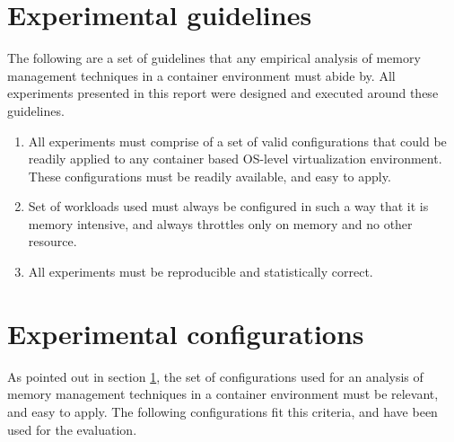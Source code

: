   \section{Experimental guidelines}
    \label{section_guidelines}
    
    The following are a set of guidelines that any empirical analysis of memory management techniques in a container environment must 
abide by.  All experiments presented in this report were designed and executed around these guidelines.

    \begin{enumerate}
      \item All experiments must comprise of a set of valid configurations that could be readily applied to any container based OS-level 
virtualization environment. These configurations must be readily available, and easy to apply.
      \item Set of workloads used must always be configured in such a way that it is memory intensive, and always throttles only on memory 
and no other resource.
      \item All experiments must be reproducible and statistically correct.      
    \end{enumerate}

  \section{Experimental configurations}
    
    As pointed out in section \ref{section_guidelines}, the set of configurations used for an analysis of memory management techniques in a 
container environment must be relevant, and easy to apply. The following configurations fit this criteria, and have been used for the 
evaluation.
    
